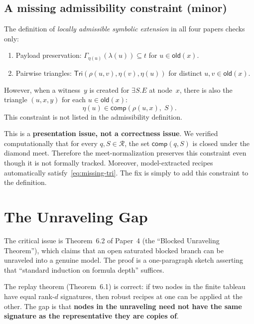\documentclass[a4paper,11pt]{article}
\theoremstyle{definition}
\newcommand{\comp}{\ensuremath{\mathsf{comp}}}
\newcommand{\Tri}{\ensuremath{\mathsf{Tri}}}
\newcommand{\old}{\ensuremath{\mathsf{old}}}
\newcommand{\Roles}{\ensuremath{\mathcal{R}}}
\begin{document}
\subsection{A missing admissibility constraint (minor)}
\label{sec:missing-constraint}

The definition of \emph{locally admissible symbolic extension} in
all four papers checks only:
\begin{enumerate}[label=(\roman*),nosep]
\item Payload preservation: $\Gamma_{\eta(u)}(\lambda(u)) \subseteq
  t$ for $u \in \old(x)$.
\item Pairwise triangles: $\Tri(\rho(u,v), \eta(v), \eta(u))$ for
  distinct $u, v \in \old(x)$.
\end{enumerate}

\noindent
However, when a witness~$y$ is created for $\exists S.E$ at node~$x$,
there is also the triangle $(u, x, y)$ for each $u \in \old(x)$:
\begin{equation}
  \label{eq:missing-tri}
  \eta(u) \in \comp(\rho(u,x),\; S).
\end{equation}
This constraint is not listed in the admissibility definition.

\medskip
This is a \textbf{presentation issue, not a correctness issue}.  We
verified computationally that for every $q, S \in \Roles$, the set
$\comp(q, S)$ is closed under the diamond meet.  Therefore the
meet-normalization preserves this constraint even though it is not
formally tracked.  Moreover, model-extracted recipes automatically
satisfy~\eqref{eq:missing-tri}.  The fix is simply to add this
constraint to the definition.


\section{The Unraveling Gap}
\label{sec:gap}

The critical issue is Theorem~6.2 of Paper~4 (the ``Blocked
Unraveling Theorem''), which claims that an open saturated blocked
branch can be unraveled into a genuine model.  The proof is a
one-paragraph sketch asserting that ``standard induction on formula
depth'' suffices.

The replay theorem (Theorem~6.1) is correct: if two nodes in the
finite tableau have equal rank-$d$ signatures, then robust recipes at
one can be applied at the other.  The gap is that \textbf{nodes in the
unraveling need not have the same signature as the representative they
are copies of}.
\end{document}
